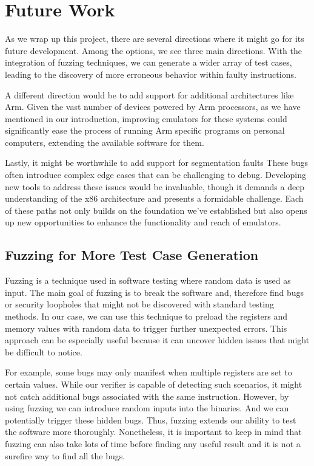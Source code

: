 
\chapter{Future Work}\label{chapter:future_work}
As we wrap up this project, there are several directions where it might go for its future development.
Among the options, we see three main directions.
With the integration of fuzzing techniques, we can generate a wider array of test cases, leading to the discovery of more erroneous behavior within faulty instructions.

A different direction would be to add support for additional architectures like Arm.
Given the vast number of devices powered by Arm processors, as we have mentioned in our introduction, improving emulators for these systems could significantly ease the process of running Arm specific programs on personal computers, extending the available software for them.

Lastly, it might be worthwhile to add support for segmentation faults
These bugs often introduce complex edge cases that can be challenging to debug.
Developing new tools to address these issues would be invaluable, though it demands a deep understanding of the x86 architecture and presents a formidable challenge.
Each of these paths not only builds on the foundation we've established but also opens up new opportunities to enhance the functionality and reach of emulators.

\section{Fuzzing for More Test Case Generation}
Fuzzing is a technique used in software testing where random data is used as input.
The main goal of fuzzing is to break the software and, therefore find bugs or security loopholes that might not be discovered with standard testing methods. 
In our case, we can use this technique to preload the registers and memory values with random data to trigger further unexpected errors.
This approach can be especially useful because it can uncover hidden issues that might be difficult to notice.

For example, some bugs may only manifest when multiple registers are set to certain values.
While our verifier is capable of detecting such scenarios, it might not catch additional bugs associated with the same instruction.
However, by using fuzzing we can introduce random inputs into the binaries.
And we can potentially trigger these hidden bugs.
Thus, fuzzing extends our ability to test the software more thoroughly.
Nonetheless, it is important to keep in mind that fuzzing can also take lots of time before finding any useful result and it is not a surefire way to find all the bugs.

